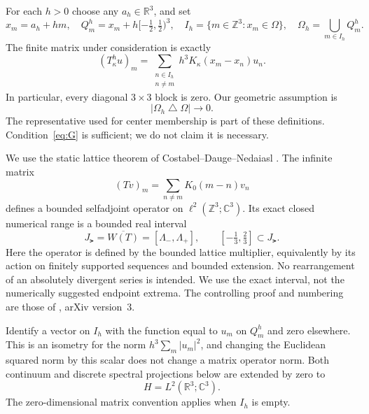 \documentclass[11pt]{article}
\theoremstyle{remark}\newtheorem{remark}[theorem]{Remark}
\newcommand{\R}{\mathbb R}\newcommand{\C}{\mathbb C}\newcommand{\Z}{\mathbb Z}
\begin{document}
For each $h>0$ choose any $a_h\in\R^3$, and set
\[
 x_m=a_h+hm,\quad Q_m^h=x_m+h[-\tfrac12,\tfrac12)^3,\quad
 I_h=\{m\in\Z^3:x_m\in\Omega\},\quad
 \Omega_h=\bigcup_{m\in I_h}Q_m^h.
\]
The finite matrix under consideration is exactly
\begin{equation}\label{eq:matrix}
 (T_\kappa^h u)_m=\sum_{\substack{n\in I_h\\n\ne m}}h^3K_\kappa(x_m-x_n)u_n.
\end{equation}
In particular, every diagonal $3\times3$ block is zero. Our geometric assumption is
\begin{equation}\tag{G}\label{eq:G}
 |\Omega_h\mathbin\triangle\Omega|\longrightarrow0.
\end{equation}
The representative used for center membership is part of these definitions. Condition~\eqref{eq:G} is sufficient; we do not claim it is necessary.

We use the static lattice theorem of Costabel--Dauge--Nedaiasl \cite{CDN}. The infinite matrix
\[
 (Tv)_m=\sum_{n\ne m}K_0(m-n)v_n
\]
defines a bounded selfadjoint operator on $\ell^2(\Z^3;\C^3)$. Its exact closed numerical range is a bounded real interval
\begin{equation}\label{eq:interval}
 J_\lat=\overline{W(T)}=[\Lambda_-,\Lambda_+],
 \qquad [-\tfrac13,\tfrac23]\subset J_\lat.
\end{equation}
Here the operator is defined by the bounded lattice multiplier, equivalently by its action on finitely supported sequences and bounded extension. No rearrangement of an absolutely divergent series is intended. We use the exact interval, not the numerically suggested endpoint extrema. The controlling proof and numbering are those of \cite[\S\S1.6,2.1--2.4,3.5; Proposition 3.15]{CDN}, arXiv version~3.

Identify a vector on $I_h$ with the function equal to $u_m$ on $Q_m^h$ and zero elsewhere. This is an isometry for the norm $h^3\sum_m|u_m|^2$, and changing the Euclidean squared norm by this scalar does not change a matrix operator norm. Both continuum and discrete spectral projections below are extended by zero to
\[
 H=L^2(\R^3;\C^3).
\]
The zero-dimensional matrix convention applies when $I_h$ is empty.
\end{document}
